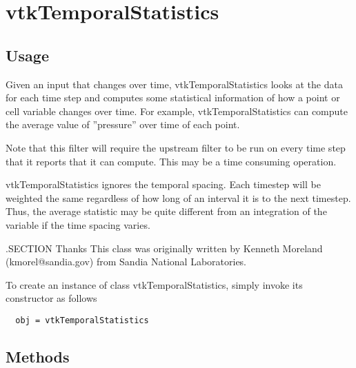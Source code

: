 \section{vtkTemporalStatistics}

\subsection{Usage}


 Given an input that changes over time, vtkTemporalStatistics looks at the
 data for each time step and computes some statistical information of how a
 point or cell variable changes over time.  For example, vtkTemporalStatistics
 can compute the average value of ''pressure'' over time of each point.

 Note that this filter will require the upstream filter to be run on every
 time step that it reports that it can compute.  This may be a time consuming
 operation.

 vtkTemporalStatistics ignores the temporal spacing.  Each timestep will be
 weighted the same regardless of how long of an interval it is to the next
 timestep.  Thus, the average statistic may be quite different from an
 integration of the variable if the time spacing varies.

 .SECTION Thanks
 This class was originally written by Kenneth Moreland (kmorel@sandia.gov)
 from Sandia National Laboratories.


To create an instance of class vtkTemporalStatistics, simply
invoke its constructor as follows
\begin{verbatim}
  obj = vtkTemporalStatistics
\end{verbatim}
\subsection{Methods}

